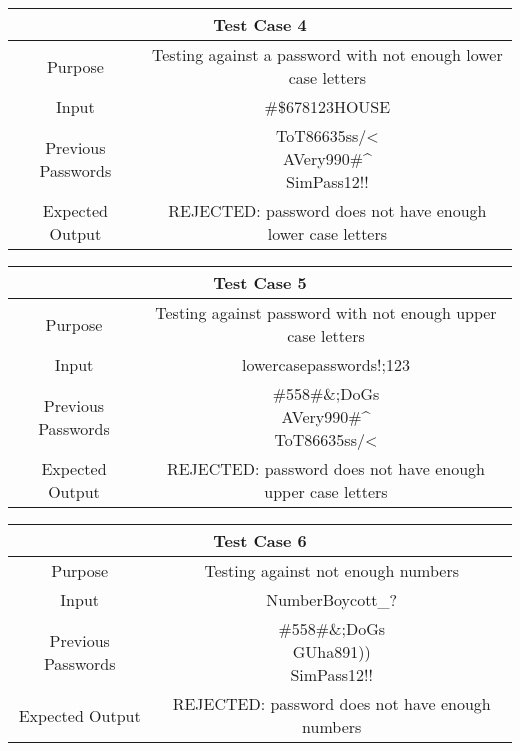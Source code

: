 \documentclass[12pt,letterpaper]{article}
\begin{document}
\vspace{1mm}
\begin{center}
  \begin{tabular}{||c|c||}
  \hline
  \multicolumn{2}{||c||}{Test Case 4} \\
  \hline
  Purpose & Testing against a password with not enough lower case letters \\
  \hline
  Input & \#\$678123HOUSE \\
  \hline
  Previous Passwords &  \specialcell{ToT86635ss/\textless\\AVery990\#\^{}\\SimPass12!!} \\
  \hline
  Expected Output & REJECTED: password does not have enough lower case letters \\
  \hline
  \end{tabular}
\end{center}
\vspace{1mm}
\begin{center}
  \begin{tabular}{||c|c||}
  \hline
  \multicolumn{2}{||c||}{Test Case 5} \\
  \hline
  Purpose & Testing against password with not enough upper case letters \\
  \hline
  Input & lowercasepasswords!;123 \\
  \hline
  Previous Passwords &  \specialcell{\#558\#\&;DoGs\\AVery990\#\^{}\\ToT86635ss/\textless} \\
  \hline
  Expected Output & REJECTED: password does not have enough upper case letters \\
  \hline
  \end{tabular}
\end{center}
\vspace{1mm}
\begin{center}
  \begin{tabular}{||c|c||}
  \hline
  \multicolumn{2}{||c||}{Test Case 6} \\
  \hline
  Purpose & Testing against not enough numbers \\
  \hline
  Input & NumberBoycott\_? \\
  \hline
  Previous Passwords &  \specialcell{\#558\#\&;DoGs\\GUha891))\\SimPass12!!} \\
  \hline
  Expected Output & REJECTED: password does not have enough numbers \\
  \hline
  \end{tabular}
\end{center}
\end{document}
